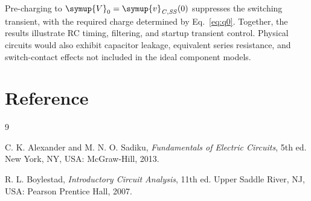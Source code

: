\documentclass[12pt,a4paper]{article}
\begin{document}
	Pre-charging to $\symup{V}_{0}=\symup{v}_{\mathit{C,SS}}(0)$ suppresses the switching
	transient, with the required charge determined by Eq.~\eqref{eq:q0}.
	Together, the results illustrate RC timing, filtering, and startup
	transient control.  Physical circuits would also exhibit capacitor
	leakage, equivalent series resistance, and switch-contact effects
	not included in the ideal component models.
	
	\section{Reference}
	\begingroup
	\makeatletter
	\def\section{\@ifstar{\@gobble}{\@gobbletwo}}%
	\makeatother
	\begin{thebibliography}{9}
		\itemsep4pt
		
		C. K. Alexander and M. N. O. Sadiku, \textit{Fundamentals of
			Electric Circuits}, 5th ed. New York, NY, USA: McGraw-Hill, 2013.
		
		R. L. Boylestad, \textit{Introductory Circuit Analysis}, 11th ed.
		Upper Saddle River, NJ, USA: Pearson Prentice Hall, 2007.
		
		
	\end{thebibliography}
	\endgroup
	
\end{document}

